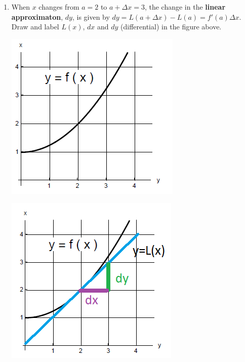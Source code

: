 \documentclass[nooutcomes,handout]{ximera}
\begin{document}
\begin{problem}
\begin{enumerate}
\item When $x$ changes from $a=2$ to $a+ \Delta x=3$, the change in the {\bf linear approximaton}, $dy$, is given by $dy=L(a+\Delta x)-L(a)=f'(a)\Delta x$.  Draw and label $L(x)$, $dx$ and $dy$ (differential) in the figure above.
   \begin{image}
      \includegraphics[scale = .7]{figure6.png}
    \end{image}
\begin{freeResponse}
   \begin{image}
      \includegraphics[scale = .7]{figure7.png}
    \end{image}
\end{freeResponse}

\end{enumerate}
\end{problem}
\end{document}
